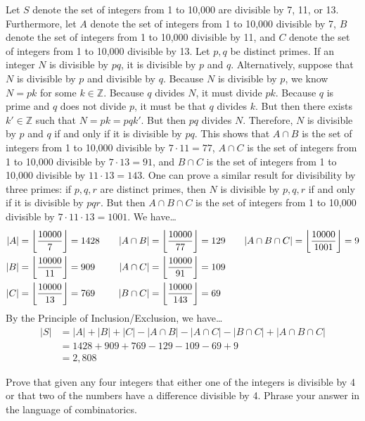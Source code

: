 \documentclass[11pt,letterpaper]{article}
\DeclarePairedDelimiter\floor{\lfloor}{\rfloor}
\begin{document}
Let $S$ denote the set of integers from 1 to 10,000 are divisible by 7, 11, or 13. Furthermore, let $A$ denote the set of integers from 1 to 10,000 divisible by 7, $B$ denote the set of integers from 1 to 10,000 divisible by 11, and $C$ denote the set of integers from 1 to 10,000 divisible by 13. Let $p, q$ be distinct primes. If an integer $N$ is divisible by $pq$, it is divisible by $p$ and $q$. Alternatively, suppose that $N$ is divisible by $p$ and divisible by $q$. Because $N$ is divisible by $p$, we know $N= pk$ for some $k \in \mathbb{Z}$. Because $q$ divides $N$, it must divide $pk$. Because $q$ is prime and $q$ does not divide $p$, it must be that $q$ divides $k$. But then there exists $k' \in \mathbb{Z}$ such that $N= pk= pqk'$. But then $pq$ divides $N$. Therefore, $N$ is divisible by $p$ and $q$ if and only if it is divisible by $pq$. This shows that $A \cap B$ is the set of integers from 1 to 10,000 divisible by $7 \cdot 11= 77$, $A \cap C$ is the set of integers from 1 to 10,000 divisible by $7 \cdot 13= 91$, and $B \cap C$ is the set of integers from 1 to 10,000 divisible by $11 \cdot 13= 143$. One can prove a similar result for divisibility by three primes: if $p, q, r$ are distinct primes, then $N$ is divisible by $p, q, r$ if and only if it is divisible by $pqr$. But then $A \cap B \cap C$ is the set of integers from 1 to 10,000 divisible by $7 \cdot 11 \cdot 13= 1001$. We have\dots
	\[
	\begin{aligned}
	|A|&= \floor*{\dfrac{10000}{7}}= 1428 \quad& |A \cap B|&= \floor*{\dfrac{10000}{77}}= 129 \quad& |A \cap B \cap C|&=  \floor*{\dfrac{10000}{1001}}= 9 \\
	|B|&= \floor*{\dfrac{10000}{11}}= 909 & |A \cap C|&= \floor*{\dfrac{10000}{91}}= 109 \\
	|C|&= \floor*{\dfrac{10000}{13}}= 769 & |B \cap C|&= \floor*{\dfrac{10000}{143}}= 69 \\
	\end{aligned}
	\]
By the Principle of Inclusion/Exclusion, we have\dots
	\[
	\begin{aligned}
	|S|&= |A| + |B| + |C| - |A \cap B| - |A \cap C| - |B \cap C| + |A \cap B \cap C| \\
	&= 1428 + 909 + 769 - 129 - 109 - 69 + 9 \\
	&= 2,\!808
	\end{aligned}
	\]



\newpage



 Prove that given any four integers that either one of the integers is divisible by 4 or that two of the numbers have a difference divisible by 4. Phrase your answer in the language of combinatorics. \pspace
\end{document}
